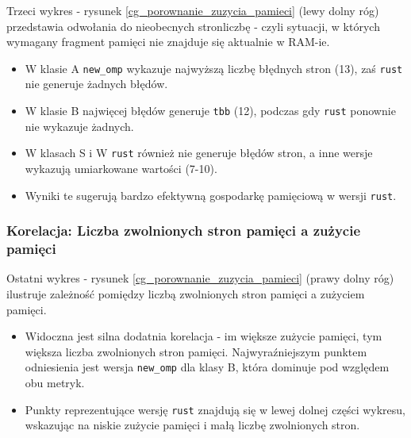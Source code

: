 Trzeci wykres - rysunek \ref{cg_porownanie_zuzycia_pamieci} (lewy dolny róg) przedstawia odwołania do nieobecnych stronliczbę  - czyli sytuacji, w których wymagany fragment pamięci nie znajduje się aktualnie w RAM-ie.
\begin{itemize}
    \item W klasie A \texttt{new\_omp} wykazuje najwyższą liczbę błędnych stron (13), zaś \texttt{rust} nie generuje żadnych błędów.
    \item W klasie B najwięcej błędów generuje \texttt{tbb} (12), podczas gdy \texttt{rust} ponownie nie wykazuje żadnych.
    \item W klasach S i W \texttt{rust} również nie generuje błędów stron, a inne wersje wykazują umiarkowane wartości (7-10).
    \item Wyniki te sugerują bardzo efektywną gospodarkę pamięciową w wersji \texttt{rust}.
\end{itemize}

\subsubsection{Korelacja: Liczba zwolnionych stron pamięci a zużycie pamięci}
Ostatni wykres - rysunek \ref{cg_porownanie_zuzycia_pamieci} (prawy dolny róg) ilustruje zależność pomiędzy liczbą zwolnionych stron pamięci a zużyciem pamięci.
\begin{itemize}
    \item Widoczna jest silna dodatnia korelacja - im większe zużycie pamięci, tym większa liczba zwolnionych stron pamięci. Najwyraźniejszym punktem odniesienia jest wersja \texttt{new\_omp} dla klasy B, która dominuje pod względem obu metryk.
    \item Punkty reprezentujące wersję \texttt{rust} znajdują się w lewej dolnej części wykresu, wskazując na niskie zużycie pamięci i małą liczbę zwolnionych stron.
\end{itemize}

